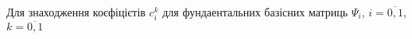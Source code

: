 Для знаходження коєфіцієтів $c_i^k$ для фундаентальних базісних матриць $\Psi_i$, $i=\overline{0,1}$, $k=\overline{0,1}$